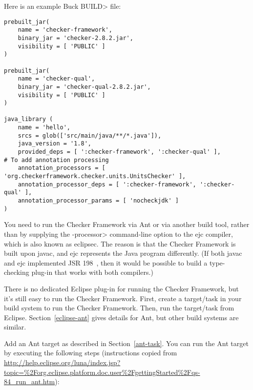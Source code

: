 Here is an example Buck \<BUILD> file:

\begin{Verbatim}
prebuilt_jar(
    name = 'checker-framework',
    binary_jar = 'checker-2.8.2.jar',
    visibility = [ 'PUBLIC' ]
)

prebuilt_jar(
    name = 'checker-qual',
    binary_jar = 'checker-qual-2.8.2.jar',
    visibility = [ 'PUBLIC' ]
)

java_library (
	name = 'hello',
	srcs = glob(['src/main/java/**/*.java']),
	java_version = '1.8',
	provided_deps = [ ':checker-framework', ':checker-qual' ],
# To add annotation processing
	annotation_processors = [ 'org.checkerframework.checker.units.UnitsChecker' ],
	annotation_processor_deps = [ ':checker-framework', ':checker-qual' ],
	annotation_processor_params = [ 'nocheckjdk' ]
)
\end{Verbatim}





You
need to run the Checker Framework via Ant or via another build tool, rather
than by supplying the \<-processor> command-line option to the ejc
compiler, which is also known as eclipsec.
The reason is that the Checker Framework is built upon javac,
and ejc represents the Java program differently.  (If both javac and ejc
implemented JSR 198~\cite{JSR198}, then it would be possible to build
a type-checking plug-in that works with both compilers.)


There is no dedicated Eclipse plug-in for running the Checker Framework,
but it's still easy to run the Checker Framework.  First, create a
target/task in your build system to run the Checker Framework.  Then, run
the target/task from Eclipse.  Section~\ref{eclipse-ant} gives details for
Ant, but other build systems are similar.



Add an Ant target as described in Section~\ref{ant-task}.  You can
run the Ant target by executing the following steps
(instructions copied from {\codesize\url{http://help.eclipse.org/luna/index.jsp?topic=%2Forg.eclipse.platform.doc.user%2FgettingStarted%2Fqs-84_run_ant.htm}}):

